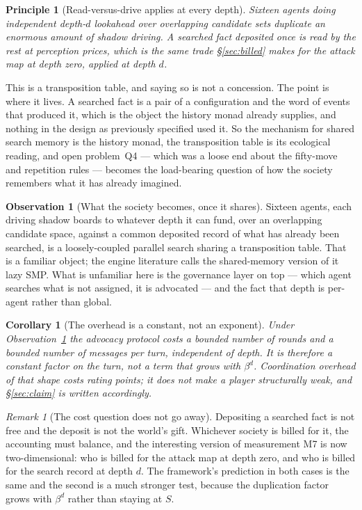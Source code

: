 \documentclass[11pt,a4paper]{article}
\theoremstyle{plain}
\newtheorem{corollary}[theorem]{Corollary}
\newtheorem{principle}[theorem]{Principle}
\theoremstyle{definition}
\newtheorem{observation}[theorem]{Observation}
\theoremstyle{remark}
\newtheorem{remark}[theorem]{Remark}
\begin{document}
\begin{principle}[Read-versus-drive applies at every depth]
\label{prin:rvd-depth}
Sixteen agents doing independent depth-$d$ lookahead over overlapping candidate
sets duplicate an enormous amount of shadow driving. A searched fact deposited
once is read by the rest at perception prices, which is the same trade
\S\ref{sec:billed} makes for the attack map at depth zero, applied at depth
$d$.
\end{principle}

This is a transposition table, and saying so is not a concession. The point is
where it lives. A searched fact is a pair of a configuration and the word of
events that produced it, which is the object the history monad already supplies,
and nothing in the design as previously specified used it. So the mechanism for
shared search memory is the history monad, the transposition table is its
ecological reading, and open problem~Q4 --- which was a loose end about the
fifty-move and repetition rules --- becomes the load-bearing question of how the
society remembers what it has already imagined.

\begin{observation}[What the society becomes, once it shares]
\label{obs:lazysmp}
Sixteen agents, each driving shadow boards to whatever depth it can fund, over an
overlapping candidate space, against a common deposited record of what has
already been searched, is a loosely-coupled parallel search sharing a
transposition table. That is a familiar object; the engine literature calls the
shared-memory version of it lazy SMP. What is unfamiliar here is the governance
layer on top --- which agent searches what is not assigned, it is advocated ---
and the fact that depth is per-agent rather than global.
\end{observation}

\begin{corollary}[The overhead is a constant, not an exponent]
\label{cor:constant}
Under Observation~\ref{obs:lazysmp} the advocacy protocol costs a bounded number
of rounds and a bounded number of messages per turn, independent of depth. It is
therefore a constant factor on the turn, not a term that grows with $\beta^d$.
Coordination overhead of that shape costs rating points; it does not make a
player structurally weak, and \S\ref{sec:claim} is written accordingly.
\end{corollary}

\begin{remark}[The cost question does not go away]
\label{rem:tt-cost}
Depositing a searched fact is not free and the deposit is not the world's gift.
Whichever society is billed for it, the accounting must balance, and the
interesting version of measurement M7 is now two-dimensional: who is billed for
the attack map at depth zero, and who is billed for the search record at depth
$d$. The framework's prediction in both cases is the same and the second is a
much stronger test, because the duplication factor grows with $\beta^d$ rather
than staying at $S$.
\end{remark}
\end{document}
